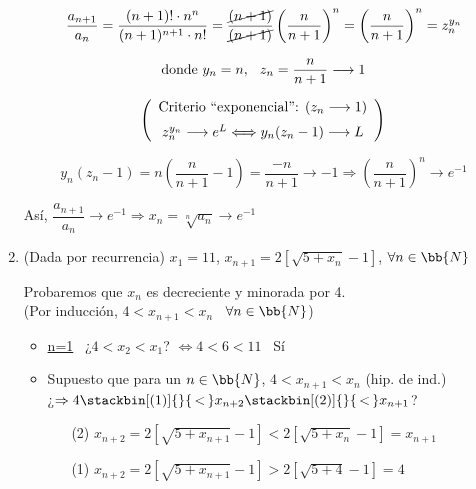 \documentclass[12pt]{article}
\begin{document}
\begin{ejercicio}[3 puntos]
\begin{enumerate}
            \[
                \dfrac{a_{n+1}}{a_n} = \dfrac{(n+1)! \cdot n^n}{(n+1)^{n+1} \cdot n!} = \dfrac{\cancel{(n+1)}}{\cancel{(n+1)}} \left( \dfrac{n}{n+1} \right)^n = \left( \dfrac{n}{n+1} \right)^n = z_n^{y_n}
            \]
            
            \[
                \text{donde } y_n=n, \hspace{0.25cm} z_n = \dfrac{n}{n+1} \longrightarrow 1
            \]

            \[ \left(
                \begin{array}{c}
                    \text{Criterio ``exponencial'': }(z_n \longrightarrow 1)\vspace{0.2cm}\\
                     z_n^{y_n} \longrightarrow e^L \Longleftrightarrow y_n(z_n -1) \longrightarrow L
                \end{array}
                \right)
            \]

            \[
                y_n(z_n-1) = n \left( \dfrac{n}{n+1} -1 \right) = \dfrac{-n}{n+1} \longrightarrow -1 \Longrightarrow \left( \dfrac{n}{n+1} \right) ^n \longrightarrow e^{-1}
            \]

            Así, $\dfrac{a_{n+1}}{a_n} \longrightarrow e^{-1} \Longrightarrow x_n = \sqrt[n]{a_n} \longrightarrow e^{-1}$
            
            \item (Dada por recurrencia) $x_1 = 11$, $x_{n+1} = 2[\sqrt{5+x_n}-1]$, $\forall n \in \bb{N}$

            Probaremos que $x_n$ es decreciente y minorada por 4.\\
            (Por inducción, $4<x_{n+1}<x_n$ \, $\forall n \in \bb{N}$)

            \begin{itemize}
                \item \underline{n=1} \, ¿$4<x_2<x_1$? $\Longleftrightarrow 4 < 6 < 11$ \, Sí
                \item Supuesto que para un $n\in \bb{N}$, $4<x_{n+1}<x_n$ (hip. de ind.)\\
                ¿$\Rightarrow 4 \stackbin[(1)]{}{\,<\,} x_{n+2} \stackbin[(2)]{}{\,<\,} x_{n+1}$?\\

                \begin{itemize}
                    \item [(2)] $x_{n+2} = 2[\sqrt{5+x_{n+1}} -1 ] < 2[\sqrt{5+x_{n}} -1 ] = x_{n+1}$
                    \item [(1)] $x_{n+2} = 2[\sqrt{5+x_{n+1}} -1 ] > 2[\sqrt{5+4} -1 ] = 4$
                \end{itemize}
            \end{itemize}


\end{enumerate}
\end{ejercicio}
\end{document}
